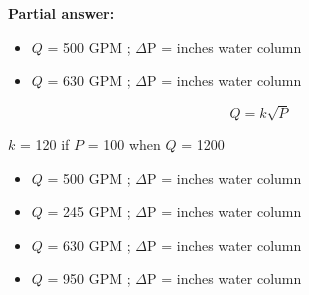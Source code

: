 





\noindent
{\bf Partial answer:}

\begin{itemize}
\item{} $Q$ = 500 GPM ; $\Delta$P =  inches water column
\item{} $Q$ = 630 GPM ; $\Delta$P =  inches water column
\end{itemize}







$$Q = k \sqrt{P}$$

$k$ = 120 if $P$ = 100 when $Q$ = 1200

\begin{itemize}
\item{} $Q$ = 500 GPM ; $\Delta$P =  inches water column
\item{} $Q$ = 245 GPM ; $\Delta$P =  inches water column
\item{} $Q$ = 630 GPM ; $\Delta$P =  inches water column
\item{} $Q$ = 950 GPM ; $\Delta$P =  inches water column
\end{itemize}





